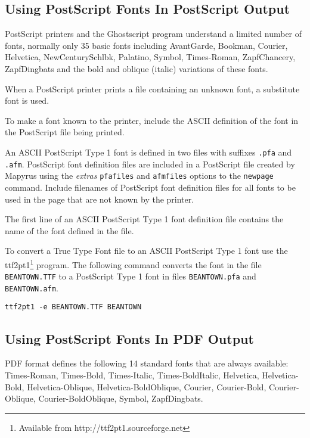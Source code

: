 \subsection{Using PostScript Fonts In PostScript Output}
\label{psfonts}

PostScript printers and the Ghostscript program
understand a limited number of fonts,
normally only 35 basic fonts including
AvantGarde,
Bookman,
Courier,
Helvetica,
NewCenturySchlbk,
Palatino,
Symbol,
Times-Roman,
ZapfChancery,
ZapfDingbats
and the bold
and oblique (italic) variations of these fonts.

When a PostScript printer prints a file containing an unknown font,
a substitute font is used.

To make a font known to the printer, include the ASCII definition of
the font in the PostScript file being printed.

An ASCII PostScript Type 1 font is defined in two files with suffixes
\texttt{.pfa} and \texttt{.afm}.  PostScript
font definition files are included in a PostScript file created
by Mapyrus using the
\textit{extras} \texttt{pfafiles} and \texttt{afmfiles}
options to the \texttt{newpage} command.
Include filenames of PostScript font definition files for all fonts to be used
in the page that are not known by the printer.

The first line of an ASCII PostScript Type 1 font definition file
contains the name of the font defined in the file.

To convert a True Type Font file to an ASCII PostScript Type 1 font use the
ttf2pt1\footnote{Available from http://ttf2pt1.sourceforge.net} program.  The
following command converts the font in the file \texttt{BEANTOWN.TTF} to a
PostScript Type 1 font in files
\texttt{BEANTOWN.pfa} and
\texttt{BEANTOWN.afm}.

\begin{verbatim}
ttf2pt1 -e BEANTOWN.TTF BEANTOWN
\end{verbatim}

\subsection{Using PostScript Fonts In PDF Output}
\label{pdffonts}

PDF format defines the following 14 standard fonts
that are always available:
Times-Roman, Times-Bold, Times-Italic, Times-BoldItalic,
Helvetica, Helvetica-Bold, Helvetica-Oblique, Helvetica-BoldOblique,
Courier, Courier-Bold, Courier-Oblique, Courier-BoldOblique,
Symbol, ZapfDingbats.

